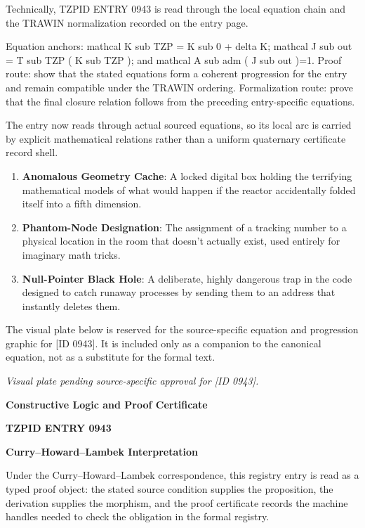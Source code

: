 Technically, TZPID ENTRY 0943 is read through the local equation chain and the TRAWIN normalization recorded on the entry page.

Equation anchors: mathcal K sub TZP = K sub 0 + delta K; mathcal J sub out = T sub TZP ( K sub TZP ); and mathcal A sub adm ( J sub out )=1. Proof route: show that the stated equations form a coherent progression for the entry and remain compatible under the TRAWIN ordering. Formalization route: prove that the final closure relation follows from the preceding entry-specific equations.

The entry now reads through actual sourced equations, so its local arc is carried by explicit mathematical relations rather than a uniform quaternary certificate record shell.
\endgroup

\begin{enumerate}[leftmargin=1.6em,itemsep=6pt,topsep=4pt]
\item \textbf{Anomalous Geometry Cache}: A locked digital box holding the terrifying mathematical models of what would happen if the reactor accidentally folded itself into a fifth dimension.
\item \textbf{Phantom-Node Designation}: The assignment of a tracking number to a physical location in the room that doesn't actually exist, used entirely for imaginary math tricks.
\item \textbf{Null-Pointer Black Hole}: A deliberate, highly dangerous trap in the code designed to catch runaway processes by sending them to an address that instantly deletes them.
\end{enumerate}

\begingroup\footnotesize\sloppy
The visual plate below is reserved for the source-specific equation and progression graphic for [ID 0943]. It is included only as a companion to the canonical equation, not as a substitute for the formal text.
\par\endgroup
\begingroup\footnotesize\itshape
Visual plate pending source-specific approval for [ID 0943].
\par\endgroup

\clearpage
\begingroup\tzpsupportsetup
\noindent\textbf{\fontsize{10.8pt}{12.8pt}\selectfont [ID 0943] Constructive Logic and Proof Certificate}\par
\noindent\textbf{\fontsize{10pt}{12pt}\selectfont TZPID ENTRY 0943}\par
\vspace{0.45em}
\begingroup
\footnotesize
\setlength{\parskip}{0.22em}
\setlength{\parindent}{0pt}
\noindent\textbf{Curry--Howard--Lambek Interpretation}\par
Under the Curry--Howard--Lambek correspondence, this registry entry is read as a typed proof
object: the stated source condition supplies the proposition, the derivation supplies the
morphism, and the proof certificate records the machine handles needed to check the obligation
in the formal registry.

